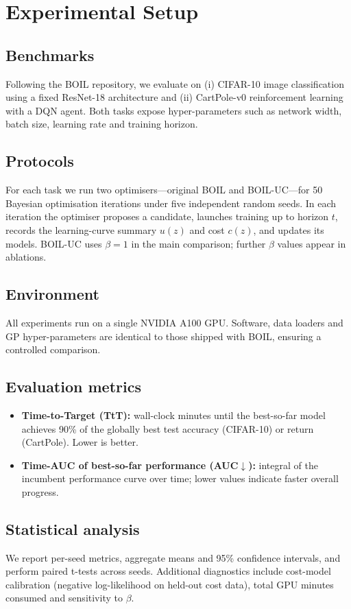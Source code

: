 \documentclass{article} %
\begin{document}
\section{Experimental Setup}
\label{sec:experimental}
\subsection{Benchmarks}
Following the BOIL repository, we evaluate on (i) CIFAR-10 image classification using a fixed ResNet-18 architecture and (ii) CartPole-v0 reinforcement learning with a DQN agent. Both tasks expose hyper-parameters such as network width, batch size, learning rate and training horizon.

\subsection{Protocols}
For each task we run two optimisers—original BOIL and BOIL-UC—for 50 Bayesian optimisation iterations under five independent random seeds. In each iteration the optimiser proposes a candidate, launches training up to horizon $t$, records the learning-curve summary $u(z)$ and cost $c(z)$, and updates its models. BOIL-UC uses $\beta=1$ in the main comparison; further $\beta$ values appear in ablations.

\subsection{Environment}
All experiments run on a single NVIDIA A100 GPU. Software, data loaders and GP hyper-parameters are identical to those shipped with BOIL, ensuring a controlled comparison.

\subsection{Evaluation metrics}
\begin{itemize}
\item \textbf{Time-to-Target (TtT):} wall-clock minutes until the best-so-far model achieves 90\% of the globally best test accuracy (CIFAR-10) or return (CartPole). Lower is better.
\item \textbf{Time-AUC of best-so-far performance (AUC$\downarrow$):} integral of the incumbent performance curve over time; lower values indicate faster overall progress.
\end{itemize}

\subsection{Statistical analysis}
We report per-seed metrics, aggregate means and 95\% confidence intervals, and perform paired t-tests across seeds. Additional diagnostics include cost-model calibration (negative log-likelihood on held-out cost data), total GPU minutes consumed and sensitivity to $\beta$.
\end{document}

